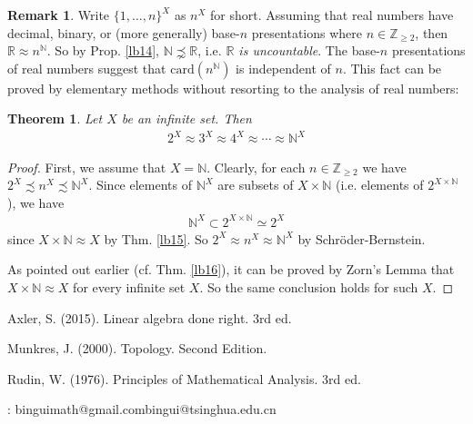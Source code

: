 \documentclass[12pt,b5paper,notitlepage]{article}
\theoremstyle{definition}
\newtheorem{rem}[df]{Remark}
\theoremstyle{plain}
\newtheorem{thm}[df]{Theorem}
\newcommand{\Nbb}{\mathbb N}
\newcommand{\Zbb}{\mathbb Z}
\newcommand{\Rbb}{\mathbb R}
\newcommand{\card}{\mathrm{card}}
\numberwithin{equation}{section}
\begin{document}
\begin{rem}
Write $\{1,\dots,n\}^X$ as $n^X$ for short.  Assuming that real numbers have decimal, binary, or (more generally) base-$n$ presentations where $n\in\Zbb_{\geq 2}$, then  $\Rbb\approx n^{\Nbb}$. So by Prop. \ref{lb14}, $\Nbb\precnsim\Rbb$, i.e. \emph{$\Rbb$ is uncountable}. The base-$n$ presentations of real numbers suggest that $\card(n^\Nbb)$ is independent of $n$. This fact can be proved by elementary methods without  resorting to the analysis of real numbers:
\end{rem}

\begin{thm}
Let $X$ be an infinite set. Then
\begin{align*}
2^X\approx 3^X\approx 4^X\approx\cdots\approx \Nbb^X
\end{align*}
\end{thm}

\begin{proof}
First, we assume that $X=\Nbb$. Clearly, for each $n\in\Zbb_{\geq 2}$ we have $2^X\precsim n^X\precsim \Nbb^X$. Since elements of $\Nbb^X$ are subsets of $X\times\Nbb$ (i.e. elements of $2^{X\times\Nbb}$), we have
\begin{align*}
\Nbb^X\subset 2^{X\times\Nbb}\simeq 2^X
\end{align*}
since $X\times\Nbb\approx X$ by Thm. \ref{lb15}. So $2^X\approx n^X\approx \Nbb^X$ by Schr\"oder-Bernstein.

As pointed out earlier (cf. Thm. \ref{lb16}), it can be proved by Zorn's Lemma that $X\times\Nbb\approx X$ for every infinite set $X$. So the same conclusion holds for such $X$.
\end{proof}















\newpage

\printindex	






	\begin{thebibliography}{999999}
		\footnotesize	

Axler, S. (2015). Linear algebra done right. 3rd ed.

Munkres, J. (2000). Topology. Second Edition.



Rudin, W. (1976). Principles of Mathematical Analysis. 3rd ed.


		
\end{thebibliography}


: binguimath@gmail.com\qquad bingui@tsinghua.edu.cn
\end{document}
